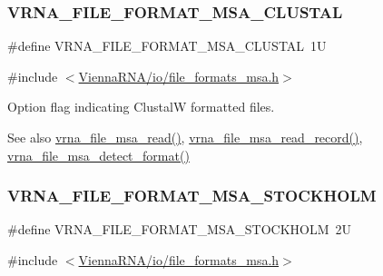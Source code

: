 \subsubsection{\texorpdfstring{V\+R\+N\+A\+\_\+\+F\+I\+L\+E\+\_\+\+F\+O\+R\+M\+A\+T\+\_\+\+M\+S\+A\+\_\+\+C\+L\+U\+S\+T\+AL}{VRNA\_FILE\_FORMAT\_MSA\_CLUSTAL}}
{\footnotesize\ttfamily \#define V\+R\+N\+A\+\_\+\+F\+I\+L\+E\+\_\+\+F\+O\+R\+M\+A\+T\+\_\+\+M\+S\+A\+\_\+\+C\+L\+U\+S\+T\+AL~1U}



{\ttfamily \#include $<$\hyperlink{io_2file__formats__msa_8h}{Vienna\+R\+N\+A/io/file\+\_\+formats\+\_\+msa.\+h}$>$}



Option flag indicating ClustalW formatted files. 

\begin{DoxySeeAlso}{See also}
\hyperlink{group__file__formats__msa_ga08a01c40ac5f5e0e04e9ae2258c99aa6}{vrna\+\_\+file\+\_\+msa\+\_\+read()}, \hyperlink{group__file__formats__msa_ga59204cd1daa4927f5127cc65a2886efd}{vrna\+\_\+file\+\_\+msa\+\_\+read\+\_\+record()}, \hyperlink{group__file__formats__msa_ga627ac281b5f11c63861726e6472626c9}{vrna\+\_\+file\+\_\+msa\+\_\+detect\+\_\+format()} 
\end{DoxySeeAlso}
\mbox{\label{group__file__formats__msa_ga62be992445cd8ab2ad7a8fded944338b}} 
\subsubsection{\texorpdfstring{V\+R\+N\+A\+\_\+\+F\+I\+L\+E\+\_\+\+F\+O\+R\+M\+A\+T\+\_\+\+M\+S\+A\+\_\+\+S\+T\+O\+C\+K\+H\+O\+LM}{VRNA\_FILE\_FORMAT\_MSA\_STOCKHOLM}}
{\footnotesize\ttfamily \#define V\+R\+N\+A\+\_\+\+F\+I\+L\+E\+\_\+\+F\+O\+R\+M\+A\+T\+\_\+\+M\+S\+A\+\_\+\+S\+T\+O\+C\+K\+H\+O\+LM~2U}



{\ttfamily \#include $<$\hyperlink{io_2file__formats__msa_8h}{Vienna\+R\+N\+A/io/file\+\_\+formats\+\_\+msa.\+h}$>$}



